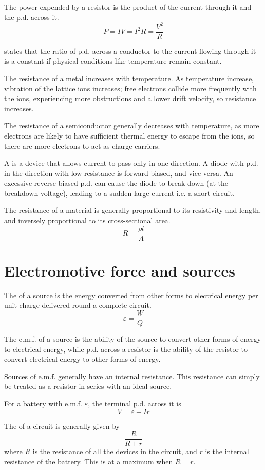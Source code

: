 \documentclass[Physics.tex]{subfiles}
\begin{document}
The power expended by a resistor is the product of the current through it and the p.d. across it. \begin{equation}P = IV = I^2R = \frac{V^2}{R}\end{equation}

 states that the ratio of p.d. across a conductor to the current flowing through it is a constant if physical conditions like temperature remain constant.

The resistance of a metal increases with temperature. As temperature increase, vibration of the lattice ions increases; free electrons collide more frequently with the ions, experiencing more obstructions and a lower drift velocity, so resistance increases.

The resistance of a semiconductor generally decreases with temperature, as more electrons are likely to have sufficient thermal energy to escape from the ions, so there are more electrons to act as charge carriers.

A  is a device that allows current to pass only in one direction. A diode with p.d. in the direction with low resistance is forward biased, and vice versa. An excessive reverse biased p.d. can cause the diode to break down (at the breakdown voltage), leading to a sudden large current i.e. a short circuit.

The resistance of a material is generally proportional to its resistivity and length, and inversely proportional to its cross-sectional area. \begin{equation}R = \frac{\rho l}{A}\end{equation}
\section{Electromotive force and sources}
The  of a source is the energy converted from other forms to electrical energy per unit charge delivered round a complete circuit. \[\varepsilon = \frac{W}{Q}\]

The e.m.f. of a source is the ability of the source to convert other forms of energy to electrical energy, while p.d. across a resistor is the ability of the resistor to convert electrical energy to other forms of energy.

Sources of e.m.f. generally have an internal resistance. This resistance can simply be treated as a resistor in series with an ideal source.

For a battery with e.m.f. \(\varepsilon\), the terminal p.d. across it is \begin{equation}V = \varepsilon - Ir\end{equation}

The  of a circuit is generally given by \begin{equation}\frac{R}{R+r}\end{equation} where \(R\) is the resistance of all the devices in the circuit, and \(r\) is the internal resistance of the battery. This is at a maximum when \(R = r\).
\end{document}
